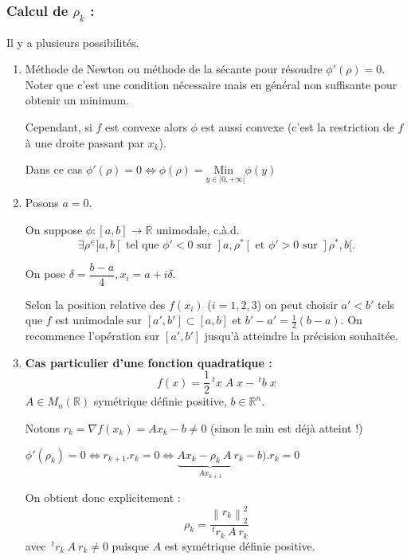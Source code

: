 \documentclass[a4paper,11pt]{article}
\newcommand{\R}{\mathbb{R}}
\newcommand{\norm}[1]{\left\lVert#1\right\rVert}
\newcommand{\tpo}[1]{\,^t#1}
\newcommand{\deffonc}[3]{#1 : #2 \longrightarrow #3}
\newcommand{\MinI}[1]{\underset{#1}{\text{Min }}}
\theoremstyle{plain} %
\begin{document}
\subsubsection*{Calcul de $\rho_k$ :}
Il y a plusieurs possibilités.
\begin{enumerate}[label=•]
    \item Méthode de Newton ou méthode de la sécante pour résoudre
        $\phi'(\rho) = 0$. Noter que c'est une condition nécessaire mais
        en général non suffisante pour obtenir un minimum.

        Cependant, si $f$ est convexe alors $\phi$ est aussi convexe (c'est
        la restriction de $f$ à une droite passant par $x_k$).

    Dans ce cas $\phi'(\rho) = 0 \iff \phi(\rho) = \MinI{y \in ]0,+\infty[}{\phi(y)}$

    \item Posons $a = 0$.
        
        On suppose $\deffonc{\phi}{[a,b]}{\R}$ unimodale, c.à.d. 
        \[
            \exists \rho^
        \in ]a,b[ \text{ tel que } \phi' < 0 \text{ sur } ]a,\rho^*[ \text{ et } \phi' > 0 
        \text{ sur } ]\rho^*, b[. 
        \]
        
        On pose $\delta = \dfrac{b-a}{4}, x_i = a + i\delta$.

        Selon la position relative des $f(x_i)$ ($i = 1,2,3$) on peut choisir
        $a' < b'$ tels que $f$ est unimodale sur $[a',b'] \subset [a,b]$ et
        $b' - a' = \frac{1}{2} (b - a)$. On recommence l'opération sur
        $[a',b']$ jusqu'à atteindre la précision souhaitée.


    \item \textbf{Cas particulier d'une fonction quadratique :}
        \[
            f(x) = \frac{1}{2} \tpo{x} \; A \; x - \tpo{b} \; x
        \]
    $A \in M_n(\R)$ symétrique définie positive, $b \in \R^n$.

    Notons $r_k = \nabla f(x_k) = A x_k - b \neq 0$ (sinon le min
    est déjà atteint !)

    $\phi'(\rho_k) = 0 \iff r_{k+1} . r_k = 0 \iff \underbrace{A x_k - \rho_k \: A \: r_k }_{Ax_{k+1}} - b) . r_k = 0$

    On obtient donc explicitement : 
    \[
        \rho_k = \frac{\norm{r_k}^2_2}{\tpo{r_k} \: A \: r_k}
    \]
    avec $\tpo{r_k} \: A \: r_k \neq 0$ puisque $A$ est symétrique définie
    positive.
\end{enumerate}
\end{document}
